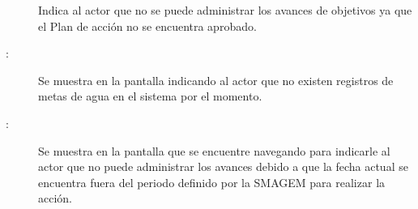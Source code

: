     \begin{description}
	\item[] Indica al actor que no se puede administrar los avances de objetivos ya que el Plan de acción no se encuentra aprobado.

    \item [:] Se muestra en la pantalla  indicando al actor que no existen registros de metas de agua en el sistema por el momento.
    
    \item [:] Se muestra en la pantalla que se encuentre navegando para indicarle al actor que no puede administrar los avances debido a que la fecha actual se encuentra fuera del periodo definido por la SMAGEM para realizar la acción.
    \end{description}
